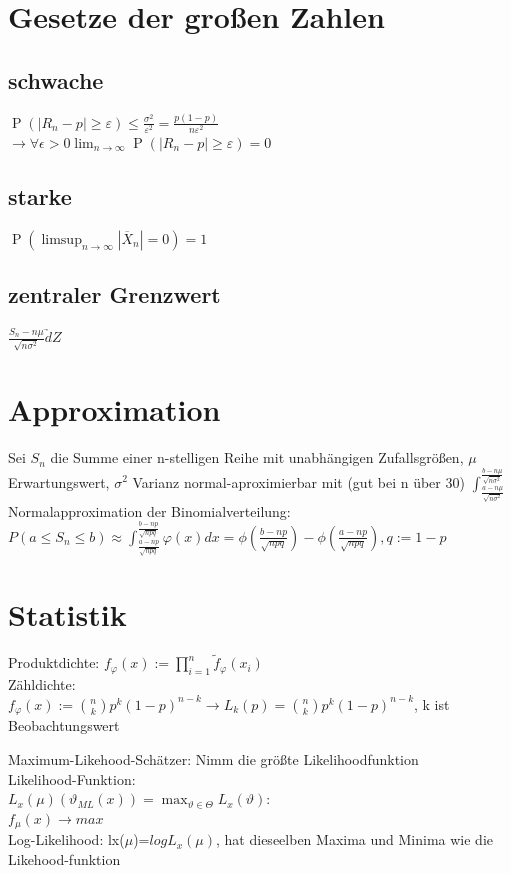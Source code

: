 \documentclass[]{article}
\begin{document}
\newpage
\section{Gesetze der großen Zahlen}
\subsection{schwache}
$\operatorname{P}\left(|R_n - p| \geq \varepsilon \right) \leq \frac{\sigma^2}{\varepsilon^2} = \frac{p(1-p)}{n \varepsilon^2}$  \\
$\rightarrow \forall \epsilon>0 \lim_{n \to \infty} \operatorname{P}\left(|R_n - p| \geq \varepsilon \right) = 0$
\subsection{starke}
$\operatorname{P}\left(\limsup_{n\rightarrow\infty}|\overline{X}_n|=0\right)=1$
\subsection{zentraler Grenzwert}
$\frac{S_n-n\mu}{\sqrt{n \sigma^2}} \underrightarrow{d} Z $
\section{Approximation}
Sei $S_n$ die Summe einer n-stelligen Reihe mit unabhängigen Zufallsgrößen, $\mu$ Erwartungswert, $\sigma^2$ Varianz
normal-aproximierbar mit  (gut bei n über 30) 
$\int_{\frac{a-n\mu}{\sqrt{n\sigma^2}}}^{\frac{b-n\mu}{\sqrt{n\sigma^2}}}$\\
Normalapproximation der Binomialverteilung: $P(a \leq S_n \leq b) \approx \int_{\frac{a-np}{\sqrt{npq}}}^{\frac{b-np}{\sqrt{npq}}} \varphi (x) dx = \phi(\frac{b-np}{\sqrt{npq}}) - \phi(\frac{a-np}{\sqrt{npq}}), q:=1-p $

\section{Statistik}
Produktdichte: $f_\varphi(x):=\prod_{i=1}^{n}\tilde{f}_\varphi(x_i)$\\
Zähldichte:\\
$f_\varphi(x):=$$\binom{n}{k}p^k(1-p)^{n-k}\rightarrow L_k(p)=\binom{n}{k}p^k(1-p)^{n-k}$, k ist Beobachtungswert

Maximum-Likehood-Schätzer: Nimm die größte Likelihoodfunktion \\ 
Likelihood-Funktion: \\ $L_x(\mu)(\vartheta_{ML}(x))=\max_{\vartheta \in \Theta}L_x(\vartheta)$:\\
$f_\mu(x)\rightarrow max$\\
Log-Likelihood: lx($\mu$)=$log L_x(\mu)$, hat dieseelben Maxima und Minima wie die Likehood-funktion
\end{document}
